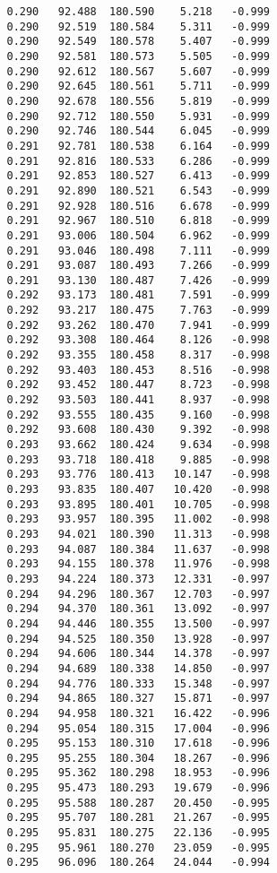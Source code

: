 \begin{verbatim}
   0.290   92.488  180.590    5.218   -0.999
   0.290   92.519  180.584    5.311   -0.999
   0.290   92.549  180.578    5.407   -0.999
   0.290   92.581  180.573    5.505   -0.999
   0.290   92.612  180.567    5.607   -0.999
   0.290   92.645  180.561    5.711   -0.999
   0.290   92.678  180.556    5.819   -0.999
   0.290   92.712  180.550    5.931   -0.999
   0.290   92.746  180.544    6.045   -0.999
   0.291   92.781  180.538    6.164   -0.999
   0.291   92.816  180.533    6.286   -0.999
   0.291   92.853  180.527    6.413   -0.999
   0.291   92.890  180.521    6.543   -0.999
   0.291   92.928  180.516    6.678   -0.999
   0.291   92.967  180.510    6.818   -0.999
   0.291   93.006  180.504    6.962   -0.999
   0.291   93.046  180.498    7.111   -0.999
   0.291   93.087  180.493    7.266   -0.999
   0.291   93.130  180.487    7.426   -0.999
   0.292   93.173  180.481    7.591   -0.999
   0.292   93.217  180.475    7.763   -0.999
   0.292   93.262  180.470    7.941   -0.999
   0.292   93.308  180.464    8.126   -0.998
   0.292   93.355  180.458    8.317   -0.998
   0.292   93.403  180.453    8.516   -0.998
   0.292   93.452  180.447    8.723   -0.998
   0.292   93.503  180.441    8.937   -0.998
   0.292   93.555  180.435    9.160   -0.998
   0.292   93.608  180.430    9.392   -0.998
   0.293   93.662  180.424    9.634   -0.998
   0.293   93.718  180.418    9.885   -0.998
   0.293   93.776  180.413   10.147   -0.998
   0.293   93.835  180.407   10.420   -0.998
   0.293   93.895  180.401   10.705   -0.998
   0.293   93.957  180.395   11.002   -0.998
   0.293   94.021  180.390   11.313   -0.998
   0.293   94.087  180.384   11.637   -0.998
   0.293   94.155  180.378   11.976   -0.998
   0.293   94.224  180.373   12.331   -0.997
   0.294   94.296  180.367   12.703   -0.997
   0.294   94.370  180.361   13.092   -0.997
   0.294   94.446  180.355   13.500   -0.997
   0.294   94.525  180.350   13.928   -0.997
   0.294   94.606  180.344   14.378   -0.997
   0.294   94.689  180.338   14.850   -0.997
   0.294   94.776  180.333   15.348   -0.997
   0.294   94.865  180.327   15.871   -0.997
   0.294   94.958  180.321   16.422   -0.996
   0.294   95.054  180.315   17.004   -0.996
   0.295   95.153  180.310   17.618   -0.996
   0.295   95.255  180.304   18.267   -0.996
   0.295   95.362  180.298   18.953   -0.996
   0.295   95.473  180.293   19.679   -0.996
   0.295   95.588  180.287   20.450   -0.995
   0.295   95.707  180.281   21.267   -0.995
   0.295   95.831  180.275   22.136   -0.995
   0.295   95.961  180.270   23.059   -0.995
   0.295   96.096  180.264   24.044   -0.994

\end{verbatim}
